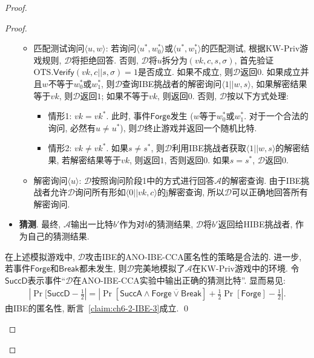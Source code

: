 \begin{proof}
\begin{proof}
\begin{trivlist}
\begin{itemize}
\begin{itemize}
			\item 匹配测试询问$\langle u, w \rangle$: 若询问$\langle u^*, w_0^*\rangle$或$\langle u^*, w_1^*\rangle$的匹配测试, 根据KW-Priv游戏规则, $\mathcal{D}$将拒绝回答. 否则, $\mathcal{D}$将$u$拆分为$(vk, c, s, \sigma)$, 首先验证$\text{OTS}.\mathsf{Verify}(vk, c||s, \sigma) = 1$是否成立. 如果不成立, 则$\mathcal{D}$返回$0$. 如果成立并且$w$不等于$w_0^*$或$w_1^*$, 则$\mathcal{D}$查询IBE挑战者的解密询问$\langle 1||w, s \rangle$, 如果解密结果等于$vk$, 则$\mathcal{D}$返回$1$; 如果不等于$vk$, 则返回$0$. 否则, $\mathcal{D}$按以下方式处理:\vspace{-0.5em}
				\begin{itemize} \itemsep 1pt \parskip 0pt \parsep 0pt
					\item 情形1: $vk = vk^*$. 此时, 事件$\mathsf{Forge}$发生 ($w$等于$w_0^*$或$w_1^*$. 对于一个合法的询问, 必然有$u \neq u^*$), 则$\mathcal{D}$终止游戏并返回一个随机比特.

					\item 情形2: $vk \neq vk^*$. 如果$s \neq s^*$, 则$\mathcal{D}$利用IBE挑战者获取$\langle 1||w, s \rangle$的解密结果, 若解密结果等于$vk$, 则返回$1$, 否则返回$0$. 如果$s = s^*$, $\mathcal{D}$返回$0$.
				\end{itemize}
			
			\item 解密询问$\langle u \rangle$: $\mathcal{D}$按照询问阶段1中的方式进行回答$\mathcal{A}$的解密查询. 由于IBE挑战者允许$\mathcal{D}$询问所有形如$\langle 0||vk, c \rangle$的j解密查询, 所以$\mathcal{D}$可以正确地回答所有解密询问.
		\end{itemize}

	\item \textbf{猜测}. 最终, $\mathcal{A}$输出一比特$b'$作为对$b$的猜测结果, $\mathcal{D}$将$b'$返回给HIBE挑战者, 作为自己的猜测结果. 	
\end{itemize}
	在上述模拟游戏中, $\mathcal{D}$攻击IBE的ANO-IBE-CCA匿名性的策略是合法的. 进一步, 若事件$\mathsf{Forge}$和$\mathsf{Break}$都未发生, 则$\mathcal{D}$完美地模拟了$\mathcal{A}$在KW-Priv游戏中的环境. 令$\mathsf{SuccD}$表示事件``$\mathcal{D}$在ANO-IBE-CCA实验中输出正确的猜测比特''. 显而易见:
\[
\begin{array}{l}
	|\Pr[\mathsf{SuccD}-\frac{1}{2}| = |\Pr[\mathsf{SuccA} \wedge \overline{\mathsf{Forge}\lor\mathsf{Break}}] + \frac{1}{2}\Pr[\mathsf{Forge}] -\frac{1}{2}|.
\end{array}
\]
由IBE的匿名性, 断言~\ref{claim:ch6-2-IBE-3}成立. \qed
\end{trivlist}


\end{proof}
\end{proof}
